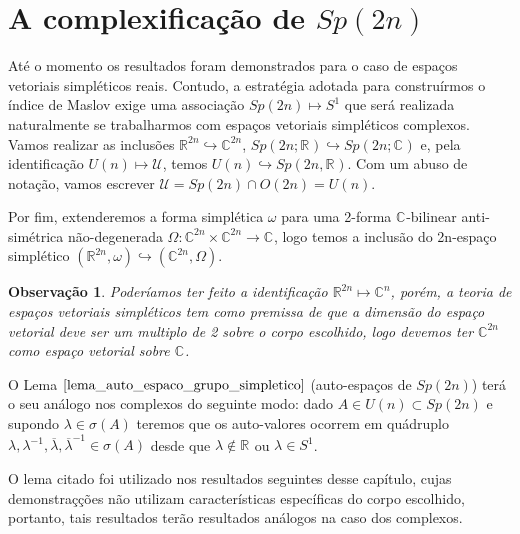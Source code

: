 \documentclass[12pt]{book}
\newtheorem{observacao}[teorema]{Observação}
\newcommand{\circulo}{S^{1}}
\newcommand{\complexo}[1]{\mathbb{C}^{#1}}
\newcommand{\gruposimpletico}[1]{Sp(#1)}
\newcommand{\gruposimpleticocomplexo}[1]{Sp(#1; \complexo{})}
\newcommand{\gruposimpleticoreal}[1]{Sp(#1;\reta)}
\newcommand{\matrizortogonal}[1]{O(#1)}
\newcommand{\matrizSimpleticaOrtogonal}{\mathcal{U}}
\newcommand{\matrizunitaria}[1]{U(#1)}
\newcommand{\real}[1]{\mathbb{R}^{#1}}
\newcommand{\reta}{\real{}}
\begin{document}
	
	\section{A complexificação de $\gruposimpletico{2n}$}\label{secao_complexificacao_grupo_simpetico}
	
		Até o momento os resultados foram demonstrados para o caso de espaços vetoriais simpléticos reais. Contudo, a estratégia adotada para construírmos o índice de Maslov exige uma associação $\gruposimpletico{2n}\mapsto \circulo$ que será realizada naturalmente se trabalharmos com espaços vetoriais simpléticos complexos. Vamos realizar as inclusões $\real{2n} \hookrightarrow \complexo{2n}$, $\gruposimpleticoreal{2n} \hookrightarrow \gruposimpleticocomplexo{2n}$ e, pela identificação $\matrizunitaria{n} \mapsto \matrizSimpleticaOrtogonal$, temos $\matrizunitaria{n} \hookrightarrow \gruposimpletico{2n, \reta}$. Com um abuso de notação, vamos escrever $\matrizSimpleticaOrtogonal = \gruposimpletico{2n} \cap \matrizortogonal{2n }= \matrizunitaria{n}$. 
		
		Por fim, extenderemos a forma simplética $\omega$ para uma 2-forma $\complexo{}$-bilinear anti-simétrica não-degenerada $\Omega:\complexo{2n}\times \complexo{2n} \to \complexo{}$, logo temos a inclusão do 2n-espaço simplético $(\real{2n}, \omega) \hookrightarrow (\complexo{2n}, \Omega)$.
		
		\begin{observacao}
			Poderíamos ter feito a identificação $\real{2n} \mapsto \complexo{n}$, porém, a teoria de espaços vetoriais simpléticos tem como premissa de que a dimensão do espaço vetorial deve ser um multiplo de 2 sobre o corpo escolhido, logo devemos ter $\complexo{2n}$ como espaço vetorial sobre $\complexo{}$.
		\end{observacao}
		
		O Lema $\ref{lema_auto_espaco_grupo_simpletico}$ (auto-espaços de $\gruposimpletico{2n}$) terá o seu análogo nos complexos do seguinte modo: dado $A \in \matrizunitaria{n}\subset \gruposimpletico{2n}$ e supondo $\lambda \in \sigma(A)$ teremos que os auto-valores ocorrem em quádruplo $\lambda, \lambda^{-1}, \overline{\lambda}, \overline{\lambda}^{-1} \in \sigma(A)$ desde que $\lambda \notin \reta$ ou $\lambda \in \circulo$. 
	
		O lema citado foi utilizado nos resultados seguintes desse capítulo, cujas demonstraçções não utilizam características específicas do corpo escolhido, portanto, tais resultados terão resultados análogos na caso dos complexos.
		
\end{document}
